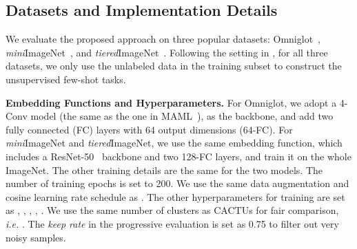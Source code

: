 \documentclass[runningheads]{llncs}
\begin{document}
\subsection{Datasets and Implementation Details}
 We evaluate the proposed approach on three popular datasets: Omniglot~\cite{lake2011one}, \textit{mini}ImageNet~\cite{ravi2016optimization}, and \textit{tiered}ImageNet~\cite{ren2018meta}. Following the setting in \cite{hsu2018unsupervised}, for all three datasets, we only use the unlabeled data in the training subset to construct the unsupervised few-shot tasks.




\noindent\textbf{Embedding Functions and Hyperparameters.} For Omniglot, we adopt a 4-Conv model (the same as the one in MAML~\cite{finn2017model}), as the backbone, and add two fully connected (FC) layers with 64 output dimensions (64-FC). For \textit{mini}ImageNet and \textit{tiered}ImageNet, we use the same embedding function, which includes a ResNet-50~\cite{he2015delving} backbone and two 128-FC layers, and train it on the whole ImageNet. The other training details are the same for the two models. The number of training epochs is set to 200. We use the same data augmentation and cosine learning rate schedule as \cite{chen2020improved}. The other hyperparameters for training are set as , , , , . We use the same number of clusters as CACTUs for fair comparison, \emph{i.e.} . The \textit{keep rate}  in the progressive evaluation is set as 0.75 to filter out very noisy samples.
\end{document}
